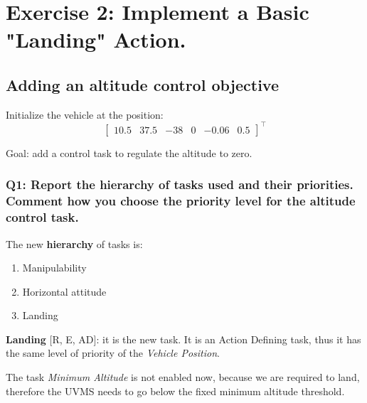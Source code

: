 \documentclass{article}
\begin{document}
\clearpage

\section{Exercise 2: Implement a Basic "Landing" Action.}
\subsection{Adding an altitude control objective}
Initialize the vehicle at the position:
\begin{displaymath}
\begin{bmatrix} 10.5 & 37.5 & -38 & 0 & -0.06 & 0.5 \end{bmatrix}^\top
\end{displaymath} 

Goal: add a control task to regulate the altitude to zero.

\subsubsection{Q1: Report the hierarchy of tasks used and their priorities. Comment how you choose the priority level for the altitude control task.}

\noindent
\vspace{5px}
The new \textbf{hierarchy} of tasks is:
\begin{enumerate}
 \item Manipulability
 \item Horizontal attitude
 \item Landing
\end{enumerate}

\noindent
\vspace{2px}
\begin{description}
\item \textbf{Landing} [R, E, AD]: it is the new task. It is an Action Defining task, thus it has the same level of priority of the \textit{Vehicle Position}.
\end{description}

\noindent
The task \textit{Minimum Altitude} is not enabled now, because we are required to land, therefore the UVMS needs to go below the fixed minimum altitude threshold.
\end{document}
